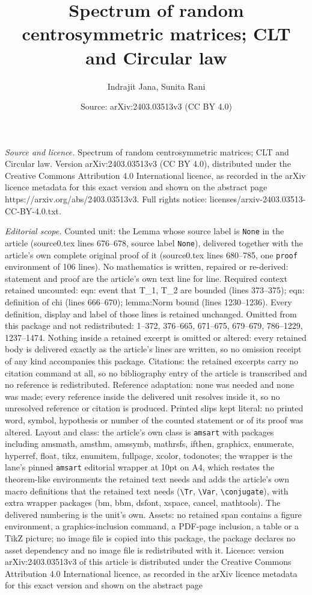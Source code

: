\documentclass[10pt,a4paper]{amsart}
\title[Spectrum of random centrosymmetric matrices; CLT and Circula]{Spectrum of random centrosymmetric matrices; CLT and Circular law}
\author{Indrajit Jana, Sunita Rani}
\date{Source: arXiv:2403.03513v3 (CC BY 4.0)}
\begin{document}
\maketitle

\noindent\emph{Source and licence.} Spectrum of random centrosymmetric matrices; CLT and Circular law. Version arXiv:2403.03513v3 (CC BY 4.0), distributed under the Creative Commons Attribution 4.0 International licence, as recorded in the arXiv licence metadata for this exact version and shown on the abstract page https://arxiv.org/abs/2403.03513v3. Full rights notice: licenses/arxiv-2403.03513-CC-BY-4.0.txt.\par\smallskip

\noindent\textit{Editorial scope.} Counted unit: the Lemma whose source label is \texttt{None} in the article (source0.tex lines 676--678, source label \texttt{None}), delivered together with the article's own complete original proof of it (source0.tex lines 680--785, one \texttt{proof} environment of 106 lines). No mathematics is written, repaired or re-derived: statement and proof are the article's own text line for line. Required context retained uncounted: eqn: event that T\_1, T\_2 are bounded (lines 373--375); eqn: definition of chi (lines 666--670); lemma:Norm bound (lines 1230--1236). Every definition, display and label of those lines is retained unchanged. Omitted from this package and not redistributed: 1--372, 376--665, 671--675, 679--679, 786--1229, 1237--1474. Nothing inside a retained excerpt is omitted or altered: every retained body is delivered exactly as the article's lines are written, so no omission receipt of any kind accompanies this package. Citations: the retained excerpts carry no citation command at all, so no bibliography entry of the article is transcribed and no reference is redistributed. Reference adaptation: none was needed and none was made; every reference inside the delivered unit resolves inside it, so no unresolved reference or citation is produced. Printed slips kept literal: no printed word, symbol, hypothesis or number of the counted statement or of its proof was altered. Layout and class: the article's own class is \texttt{amsart} with packages including amsmath, amsthm, amssymb, mathrsfs, ifthen, graphicx, enumerate, hyperref, float, tikz, enumitem, fullpage, xcolor, todonotes; the wrapper is the lane's pinned \texttt{amsart} editorial wrapper at 10pt on A4, which restates the theorem-like environments the retained text needs and adds the article's own macro definitions that the retained text needs (\texttt{\textbackslash Tr}, \texttt{\textbackslash Var}, \texttt{\textbackslash conjugate}), with extra wrapper packages (bm, bbm, dsfont, xspace, cancel, mathtools). The delivered numbering is the unit's own. Assets: no retained span contains a figure environment, a graphics-inclusion command, a PDF-page inclusion, a table or a TikZ picture; no image file is copied into this package, the package declares no asset dependency and no image file is redistributed with it. Licence: version arXiv:2403.03513v3 of this article is distributed under the Creative Commons Attribution 4.0 International licence, as recorded in the arXiv licence metadata for this exact version and shown on the abstract page 
\end{document}

